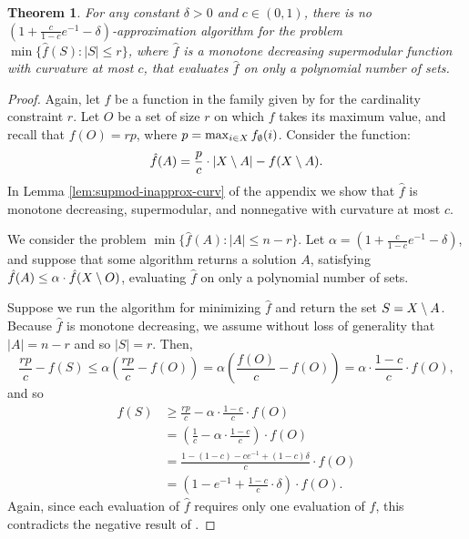 \documentclass{article}
\newtheorem{theorem}{Theorem}[section]
\theoremstyle{definition}
\begin{document}
\begin{theorem}
\label{lem:supmod-inapprox}
For any constant $\delta > 0$ and $c \in (0,1)$, there is no $(1 + \frac{c}{1-c}e^{-1} - \delta)$-approximation algorithm for the problem $\min \{ \hat{f}(S) : |S| \le r \}$, where $\hat{f}$ is a monotone decreasing supermodular function with curvature at most $c$, that evaluates $\hat{f}$ on only a polynomial number of sets.
\end{theorem}
\begin{proof}
Again, let $f$ be a function in the family given by \cite{Nemhauser1978} for the cardinality constraint $r$.  Let $O$ be a set of size $r$ on which $f$ takes its maximum value, and recall that $f(O) = rp$, where $p = \max_{i \in X} f_{\emptyset}(i)$.   Consider the function: \[\hat{f}(A) = \frac{p}{c}\cdot |X \setminus A| - f(X \setminus A).\]  In Lemma \ref{lem:supmod-inapprox-curv} of the appendix we show that $\hat{f}$ is monotone decreasing, supermodular, and nonnegative with curvature at most $c$.   

We consider the problem $\min\{\hat{f}(A) : |A| \le n - r\}$.  Let $\alpha = (1 + \frac{c}{1-c}e^{-1} - \delta)$, and suppose that some algorithm returns a solution $A$, satisfying $\hat{f}(A) \le \alpha \cdot \hat{f}(X \setminus O)$, evaluating $\hat{f}$ on only a polynomial number of sets.  

Suppose we run the algorithm for minimizing $\hat{f}$ and return the set $S = X\setminus A$.  Because $\hat{f}$ is monotone decreasing, we assume without loss of generality that $|A| = n - r$ and so $|S| = r$.  Then,
\begin{equation*}
\frac{rp}{c} - f(S) \le \alpha\left(\frac{rp}{c} - f(O)\right) 
= \alpha\left(\frac{f(O)}{c} - f(O)\right) = \alpha \cdot \frac{1-c}{c} \cdot f(O),
\end{equation*}
and so
\begin{align*}
 f(S) &\ge \frac{rp}{c} - \alpha \cdot \frac{1 - c}{c}\cdot f(O) \\
&= \left(\frac{1}{c} - \alpha \cdot \frac{1 - c}{c}\right)\cdot f(O) \\
&= \frac{1 - (1 - c) - ce^{-1} + (1-c)\delta}{c} \cdot f(O) \\
&= \left(1 - e^{-1} + \frac{1-c}{c}\cdot \delta\right)\cdot f(O).
\end{align*}
Again, since each evaluation of $\hat{f}$ requires only one evaluation of $f$, this contradicts the negative result of \cite{Nemhauser1978}.
\end{proof}
\end{document}
